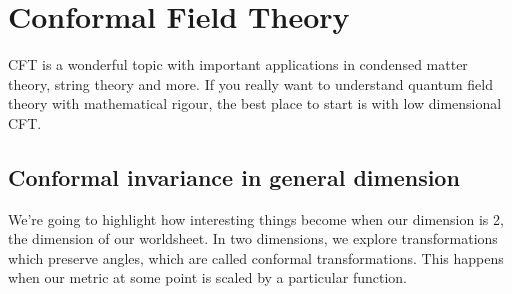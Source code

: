 \documentclass[11pt, oneside]{article}   	%
\theoremstyle{slanted}
\begin{document}
\pagebreak 
\section{Conformal Field Theory}
CFT is a wonderful topic with 
important applications in condensed matter theory, 
string theory and more. If you really want to 
understand quantum field theory with mathematical rigour, 
the best place to start is with low dimensional 
CFT. 

\subsection{Conformal invariance in general dimension}
We're going to highlight 
how interesting things become when our dimension is 
2, the dimension of our worldsheet. In two dimensions, 
we explore transformations which preserve 
angles, which are called conformal transformations. 
This happens when our metric at some 
point is scaled by a particular function. 
\end{document}
